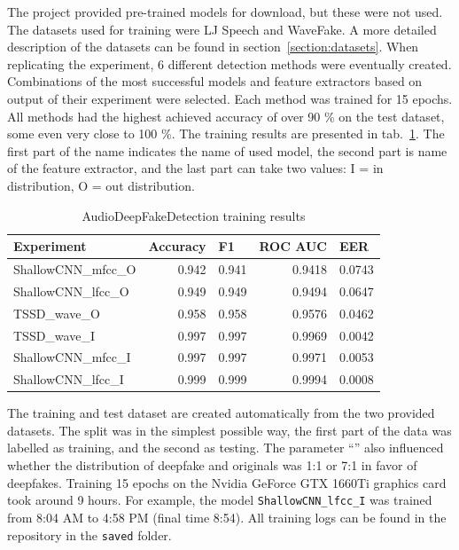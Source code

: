 The project provided pre-trained models for download, but these were not used. The datasets used for training were LJ Speech and WaveFake. A more detailed description of the datasets can be found in section~\ref{section:datasets}. When replicating the experiment, 6 different detection methods were eventually created. Combinations of the most successful models and feature extractors based on output of their experiment were selected. Each method was trained for 15 epochs. All methods had the highest achieved accuracy of over 90 \% on the test dataset, some even very close to 100 \%. The training results are presented in tab.~\ref{table:training_results}. The first part of the name indicates the name of used model, the second part is name of the feature extractor, and the last part can take two values: I = in distribution, O = out distribution.

\begin{table}[H]
    \centering
    \begin{tabular}{|l|r|r|r|r|}
        \hline
        Experiment & \multicolumn{1}{l|}{Accuracy} & \multicolumn{1}{l|}{F1} & \multicolumn{1}{l|}{ROC AUC} & \multicolumn{1}{l|}{EER} \\ \hline
        ShallowCNN\_mfcc\_O & 0.942 & 0.941 & 0.9418 & 0.0743 \\ \hline
        ShallowCNN\_lfcc\_O & 0.949 & 0.949 & 0.9494 & 0.0647 \\ \hline
        TSSD\_wave\_O & 0.958 & 0.958 & 0.9576 & 0.0462 \\ \hline
        TSSD\_wave\_I & 0.997 & 0.997 & 0.9969 & 0.0042 \\ \hline
        ShallowCNN\_mfcc\_I & 0.997 & 0.997 & 0.9971 & 0.0053 \\ \hline
        ShallowCNN\_lfcc\_I & 0.999 & 0.999 & 0.9994 & 0.0008 \\ \hline
    \end{tabular}
    \caption{AudioDeepFakeDetection training results}
    \label{table:training_results}
\end{table}

The training and test dataset are created automatically from the two provided datasets. The split was in the simplest possible way, the first part of the data was labelled as training, and the second as testing. The parameter “” also influenced whether the distribution of deepfake and originals was 1:1 or 7:1 in favor of deepfakes. Training 15 epochs on the Nvidia GeForce GTX 1660Ti graphics card took around 9 hours. For example, the model \texttt{ShallowCNN\_lfcc\_I} was trained from 8:04 AM to 4:58 PM (final time 8:54). All training logs can be found in the repository in the \texttt{saved} folder.


